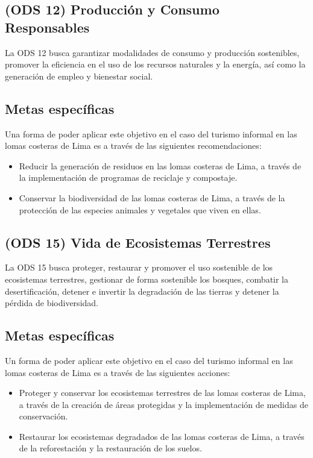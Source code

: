 \documentclass[a4paper,11pt]{article}
\begin{document}
\subsection{(ODS 12) Producción y Consumo Responsables}
La ODS 12 busca garantizar modalidades de consumo y producción sostenibles, promover la eficiencia en el uso de los recursos naturales y la energía, así como la generación de empleo y bienestar social.
\subsection{Metas específicas}
Una forma de poder aplicar este objetivo en el caso del turismo informal en las lomas costeras de Lima es a través de las siguientes recomendaciones:
\begin{itemize}
    \item Reducir la generación de residuos en las lomas costeras de Lima, a través de la implementación de programas de reciclaje y compostaje.
    \item Conservar la biodiversidad de las lomas costeras de Lima, a través de la protección de las especies animales y vegetales que viven en ellas.
  \end{itemize}
\subsection{(ODS 15) Vida de Ecosistemas Terrestres}
La ODS 15 busca proteger, restaurar y promover el uso sostenible de los ecosistemas terrestres, gestionar de forma sostenible los bosques, combatir la desertificación, detener e invertir la degradación de las tierras y detener la pérdida de biodiversidad.
\subsection{Metas específicas}
Un forma de poder aplicar este objetivo en el caso del turismo informal en las lomas costeras de Lima es a través de las siguientes acciones:
\begin{itemize}
    \item Proteger y conservar los ecosistemas terrestres de las lomas costeras de Lima, a través de la creación de áreas protegidas y la implementación de medidas de conservación.
    \item Restaurar los ecosistemas degradados de las lomas costeras de Lima, a través de la reforestación y la restauración de los suelos.
  \end{itemize}
\end{document}

